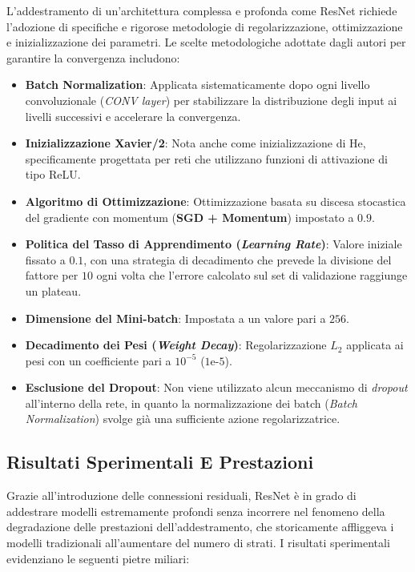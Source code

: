 ﻿\documentclass[11pt, a4paper]{article}
\begin{document}
L'addestramento di un'architettura complessa e profonda come ResNet richiede l'adozione di specifiche e rigorose metodologie di regolarizzazione, ottimizzazione e inizializzazione dei parametri. Le scelte metodologiche adottate dagli autori per garantire la convergenza includono:

\begin{itemize}
    \item \textbf{Batch Normalization}: Applicata sistematicamente dopo ogni livello convoluzionale (\emph{CONV layer}) per stabilizzare la distribuzione degli input ai livelli successivi e accelerare la convergenza.
    \item \textbf{Inizializzazione Xavier/2}: Nota anche come inizializzazione di He, specificamente progettata per reti che utilizzano funzioni di attivazione di tipo ReLU.
    \item \textbf{Algoritmo di Ottimizzazione}: Ottimizzazione basata su discesa stocastica del gradiente con momentum (\textbf{SGD + Momentum}) impostato a $0.9$.
    \item \textbf{Politica del Tasso di Apprendimento (\emph{Learning Rate})}: Valore iniziale fissato a $0.1$, con una strategia di decadimento che prevede la divisione del fattore per $10$ ogni volta che l'errore calcolato sul set di validazione raggiunge un plateau.
    \item \textbf{Dimensione del Mini-batch}: Impostata a un valore pari a $256$.
    \item \textbf{Decadimento dei Pesi (\emph{Weight Decay})}: Regolarizzazione $L_2$ applicata ai pesi con un coefficiente pari a $10^{-5}$ ($1\text{e-}5$).
    \item \textbf{Esclusione del Dropout}: Non viene utilizzato alcun meccanismo di \emph{dropout} all'interno della rete, in quanto la normalizzazione dei batch (\emph{Batch Normalization}) svolge già una sufficiente azione regolarizzatrice.
\end{itemize}

\subsection{Risultati Sperimentali E Prestazioni}

Grazie all'introduzione delle connessioni residuali, ResNet è in grado di addestrare modelli estremamente profondi senza incorrere nel fenomeno della degradazione delle prestazioni dell'addestramento, che storicamente affliggeva i modelli tradizionali all'aumentare del numero di strati. I risultati sperimentali evidenziano le seguenti pietre miliari:
\end{document}

